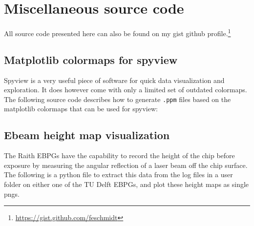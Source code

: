 \newchapstyle
\chapter{Miscellaneous source code}

\afterpage{\pagecolor{none}}\newpage

All source code presented here can also be found on my gist github profile.\footnote{\url{https://gist.github.com/feschmidt}}

\section{Matplotlib colormaps for spyview}\label{app:spyview}
Spyview is a very useful piece of software for quick data visualization and exploration.
It does however come with only a limited set of outdated colormaps.
The following source code describes how to generate \texttt{.ppm} files based on the matplotlib colormaps that can be used for spyview:



\clearpage
\section{Ebeam height map visualization}

The Raith EBPGs have the capability to record the height of the chip before exposure by measuring the angular reflection of a laser beam off the chip surface.
%
The following is a python file to extract this data from the log files in a user folder on either one of the TU Delft EBPGs, and plot these height maps as single pngs.




